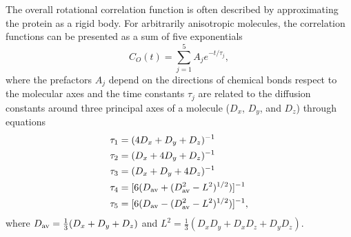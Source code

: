 \documentclass[journal=jpcbfk,manuscript=article]{achemso}
\providecommand{\DIFaddbegin}{} %
\providecommand{\DIFaddend}{} %
\providecommand{\DIFdelbegin}{} %
\providecommand{\DIFdelend}{} %
\begin{document}
The overall rotational correlation function is often described
by approximating the protein as a rigid body.
For arbitrarily anisotropic molecules, the correlation functions
can  be presented as a sum of five exponentials~\cite{woessner62,korzhnev01}
\begin{equation}\label{CORRFanisot}
  C_O(t)=\sum_{j=1}^5 A_j e^{-t/\tau_j},
\end{equation}
where the prefactors $A_j$ depend on the directions of chemical bonds 
respect to the molecular axes \cite{woessner62,luginbuhl97} and
the time constants $\tau_j$ are related 
to the diffusion constants around
three principal axes of a molecule
($D_{x}$, $D_{y}$, and $D_{z}$) through equations~\cite{woessner62,korzhnev01}
\begin{equation}\label{tauDIFFeq}
  \DIFdelbegin %
\DIFdelend \DIFaddbegin \begin{split}
  \tau_1&=(4D_{x}+D_{y}+D_{z})^{-1} \\
  \tau_2&=(D_{x}+4D_{y}+D_{z})^{-1} \\
  \tau_3&=(D_{x}+D_{y}+4D_{z})^{-1} \\
  \tau_4&=[6(D_{\rm av}+(D_{\rm av}^2-L^2)^{1/2})]^{-1} \\
  \tau_5&=[6(D_{\rm av}-(D_{\rm av}^2-L^2)^{1/2})]^{-1}, \\
  \end{split}
\DIFaddend \end{equation}
where $D_{\rm av}=\frac{1}{3}(D_{x}+D_{y}+D_{z})$ and 
$L^2=\frac{1}{3}(D_{x}D_{y}+D_{x}D_{z}+D_{y}D_{z})$.
\end{document}
